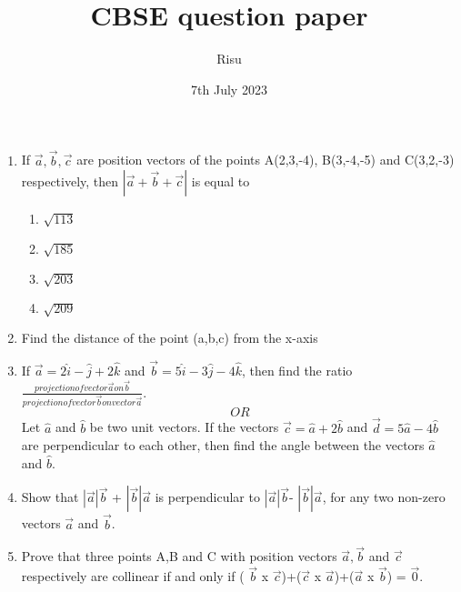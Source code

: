 \documentclass[12pt]{article}
\begin{document}
\title{\textbf{CBSE question paper}}
\author{Risu}
\date{7th July 2023}
\maketitle
\begin{enumerate}
	\item If $ \vec{a},\vec{b}, \vec{c} $ are position vectors of the points A(2,3,-4), B(3,-4,-5) and C(3,2,-3) respectively, then $ \left|\vec{a}+\vec{b}+\vec{c} \right| $ is equal to
		\begin{enumerate}
			\item $\sqrt{113}$
			\item $\sqrt{185}$
			\item $\sqrt{203}$
			\item $\sqrt{209}$
		\end{enumerate}
\item Find the distance of the point (a,b,c) from the x-axis
\item If $ \vec{a}=2\hat{i}-\hat{j}+2\hat{k} $ and $ \vec{b}=5\hat{i}-3\hat{j}-4\hat{k} $, then find the ratio $ \frac{projection of vector \vec{a} on \vec{b}}{projection of vector \vec{b} on vector \vec{a}} $.
 $$ OR $$
 Let $\hat{a}$ and $\hat{b}$  be two unit vectors. If the vectors $\vec{c}=\hat{a}+2\hat{b}$ and $\vec{d}=5\hat{a}-4\hat{b}$ are perpendicular to each other, then find the angle between the vectors $\hat{a}$ and $\hat{b}$.
\item Show that $ \left| \vec{a} \right| \vec{b}$ + $ \left|\vec{b} \right| \vec{a}$ is perpendicular to $\left|\vec{a} \right| \vec{b} $- $ \left|\vec{b} \right| \vec{a} $, for any two non-zero vectors $\vec{a}$ and $\vec{b}$.
\item Prove that three points A,B and C with position vectors $\vec{a}, \vec{b}$ and $\vec{c}$ respectively are collinear if and only if ( $\vec{b}$ x $\vec{c}$)+($\vec{c}$ x $\vec{a}$)+($\vec{a}$ x $\vec{b}$) = $\vec{0}$.
\end{enumerate}
\end{document}
